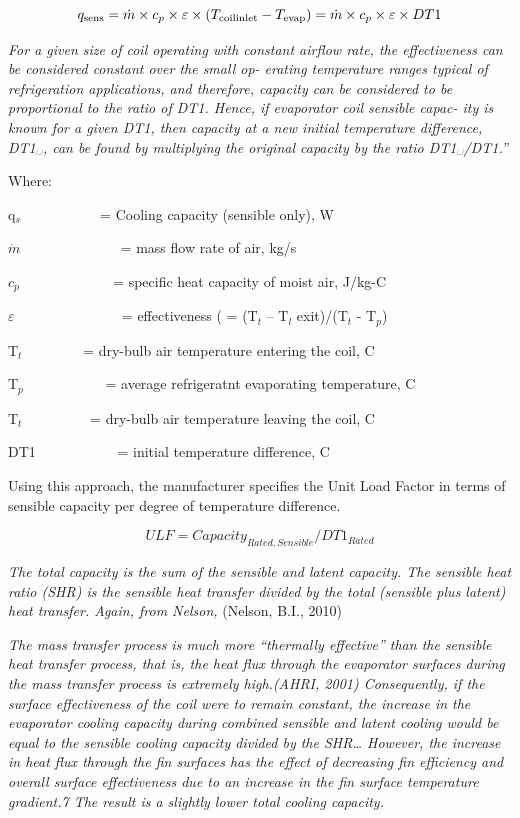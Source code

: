 \begin{equation}
{q_{{\rm{sens}}}} = \dot m \times {c_p} \times \varepsilon  \times ({T_{{\rm{coil inlet}}}} - {T_{{\rm{evap}}}}) = \dot m \times {c_p} \times \varepsilon  \times DT1
\end{equation}

\emph{For a given size of coil operating with constant airflow rate, the effectiveness can be considered constant over the small op- erating temperature ranges typical of refrigeration applications, and therefore, capacity can be considered to be proportional to the ratio of DT1. Hence, if evaporator coil sensible capac- ity is known for a given DT1, then capacity at a new initial temperature difference, DT1␣, can be found by multiplying the original capacity by the ratio DT1␣/DT1.''}

Where:

q\(_{s}\) ~~~~~~~~~~ = Cooling capacity (sensible only), W

\(\dot m\) ~~~~~~~~~~~~~ = mass flow rate of air, kg/s

\({c_p}\) ~~~~~~~~~~~~ = specific heat capacity of moist air, J/kg-C

\(\varepsilon\) ~~~~~~~~~~~~~~ = effectiveness ( = (T\(_{t}\) -- T\(_{l}\) exit)/(T\(_{t}\) - T\(_{p}\))

T\(_{t}\)~~~~~~~~ = dry-bulb air temperature entering the coil, C

T\(_{p}\)~~~~~~~~~~~ = average refrigeratnt evaporating temperature, C

T\(_{t}\)~~~~~~~~~ = dry-bulb air temperature leaving the coil, C

DT1~~~~~~~~~~~ = initial temperature difference, C

Using this approach, the manufacturer specifies the Unit Load Factor in terms of sensible capacity per degree of temperature difference.

\begin{equation}
ULF = Capacit{y_{Rated,Sensible}}/DT{1_{Rated}}
\end{equation}

\emph{The total capacity is the sum of the sensible and latent capacity. The sensible heat ratio (SHR) is the sensible heat transfer divided by the total (sensible plus latent) heat transfer. Again, from Nelson,} (Nelson, B.I., 2010)

\emph{The mass transfer process is much more ``thermally effective'' than the sensible heat transfer process, that is, the heat flux through the evaporator surfaces during the mass transfer process is extremely high.(AHRI, 2001) Consequently, if the surface effectiveness of the coil were to remain constant, the increase in the evaporator cooling capacity during combined sensible and latent cooling would be equal to the sensible cooling capacity divided by the SHR\ldots{} However, the increase in heat flux through the fin surfaces has the effect of decreasing fin efficiency and overall surface effectiveness due to an increase in the fin surface temperature gradient.7 The result is a slightly lower total cooling capacity.}


